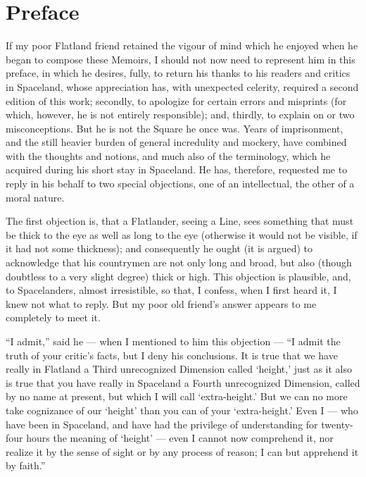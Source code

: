 \documentclass[10pt, kindle, oneside]{kindle}
\begin{document}
\chapter*{Preface}


If my poor Flatland friend retained the vigour of mind which he enjoyed when
he began to compose these Memoirs, I should not now need to represent him in
this preface, in which he desires, fully, to return his thanks to his readers
and critics in Spaceland, whose appreciation has, with unexpected celerity,
required a second edition of this work; secondly, to apologize for certain
errors and misprints (for which, however, he is not entirely responsible);
and, thirdly, to explain on or two misconceptions. But he is not the Square he
once was. Years of imprisonment, and the still heavier burden of general
incredulity and mockery, have combined with the thoughts and notions, and much
also of the terminology, which he acquired during his short stay in Spaceland.
He has, therefore, requested me to reply in his behalf to two special
objections, one of an intellectual, the other of a moral nature.

The first objection is, that a Flatlander, seeing a Line, sees something that
must be thick to the eye as well as long to the eye (otherwise it would not be
visible, if it had not some thickness); and consequently he ought (it is
argued) to acknowledge that his countrymen are not only long and broad, but
also (though doubtless to a very slight degree) thick or high. This objection
is plausible, and, to Spacelanders, almost irresistible, so that, I confess,
when I first heard it, I knew not what to reply. But my poor old friend's
answer appears to me completely to meet it.

``I admit,'' said he --- when I mentioned to him this objection --- ``I admit the
truth of your critic's facts, but I deny his conclusions. It is true that we
have really in Flatland a Third unrecognized Dimension called `height,' just
as it also is true that you have really in Spaceland a Fourth unrecognized
Dimension, called by no name at present, but which I will call `extra-height.'
But we can no more take cognizance of our `height' than you can of your
`extra-height.' Even I --- who have been in Spaceland, and have had the
privilege of understanding for twenty-four hours the meaning of `height' ---
even I cannot now comprehend it, nor realize it by the sense of sight or by
any process of reason; I can but apprehend it by faith.''
\end{document}
